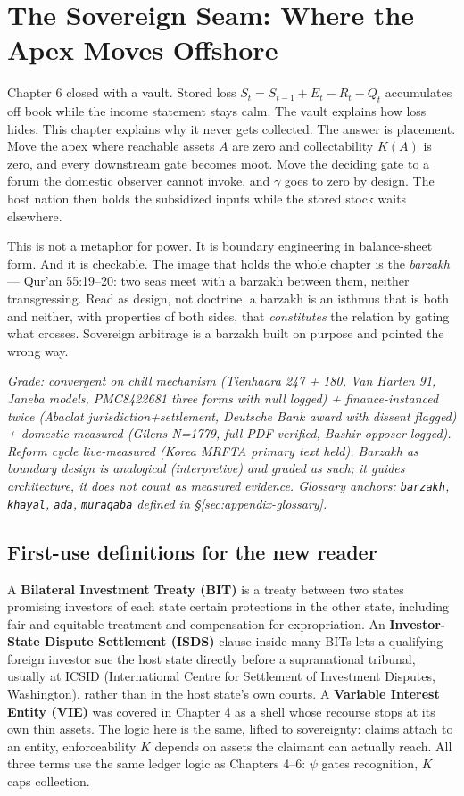 \chapter{The Sovereign Seam: Where the Apex Moves Offshore}
\label{ch:sovereign}

Chapter 6 closed with a vault. Stored loss $S_t = S_{t-1} + E_t - R_t - Q_t$ accumulates off book while the income statement stays calm. The vault explains how loss hides. This chapter explains why it never gets collected. The answer is placement. Move the apex where reachable assets $A$ are zero and collectability $K(A)$ is zero, and every downstream gate becomes moot. Move the deciding gate to a forum the domestic observer cannot invoke, and $\gamma$ goes to zero by design. The host nation then holds the subsidized inputs while the stored stock waits elsewhere.

This is not a metaphor for power. It is boundary engineering in balance-sheet form. And it is checkable. The image that holds the whole chapter is the \textit{barzakh} --- Qur'an 55:19--20: two seas meet with a barzakh between them, neither transgressing. Read as design, not doctrine, a barzakh is an isthmus that is both and neither, with properties of both sides, that \textit{constitutes} the relation by gating what crosses. Sovereign arbitrage is a barzakh built on purpose and pointed the wrong way.

\textit{Grade: convergent on chill mechanism (Tienhaara 247 + 180, Van Harten 91, Janeba models, PMC8422681 three forms with null logged) + finance-instanced twice (Abaclat jurisdiction+settlement, Deutsche Bank award with dissent flagged) + domestic measured (Gilens N=1779, full PDF verified, Bashir opposer logged). Reform cycle live-measured (Korea MRFTA primary text held). Barzakh as boundary design is analogical (interpretive) and graded as such; it guides architecture, it does not count as measured evidence. Glossary anchors: \texttt{barzakh}, \texttt{khayal}, \texttt{ada}, \texttt{muraqaba} defined in \S\ref{sec:appendix-glossary}.}

\section{First-use definitions for the new reader}

A \textbf{Bilateral Investment Treaty (BIT)} is a treaty between two states promising investors of each state certain protections in the other state, including fair and equitable treatment and compensation for expropriation. An \textbf{Investor-State Dispute Settlement (ISDS)} clause inside many BITs lets a qualifying foreign investor sue the host state directly before a supranational tribunal, usually at ICSID (International Centre for Settlement of Investment Disputes, Washington), rather than in the host state's own courts. A \textbf{Variable Interest Entity (VIE)} was covered in Chapter 4 as a shell whose recourse stops at its own thin assets. The logic here is the same, lifted to sovereignty: claims attach to an entity, enforceability $K$ depends on assets the claimant can actually reach. All three terms use the same ledger logic as Chapters 4--6: $\psi$ gates recognition, $K$ caps collection.

